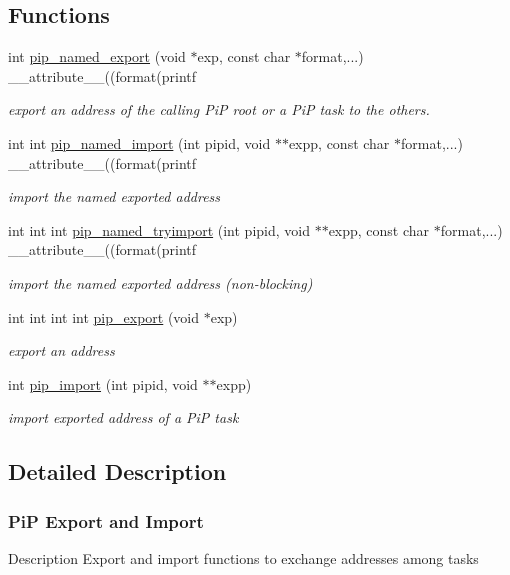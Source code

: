 \documentclass[twoside]{book}
\begin{document}
\subsection*{Functions}
\begin{DoxyCompactItemize}
\item 
int \hyperlink{group__pip-4-export_ga3613eaa34ad5a4985007ff9177eb6542}{pip\-\_\-named\-\_\-export} (void $\ast$exp, const char $\ast$format,...) \-\_\-\-\_\-attribute\-\_\-\-\_\-((format(printf
\begin{DoxyCompactList}\small\item\em export an address of the calling Pi\-P root or a Pi\-P task to the others. \end{DoxyCompactList}\item 
int int \hyperlink{group__pip-4-export_ga68bcfa436ddc6acaf25f67fc30430fc1}{pip\-\_\-named\-\_\-import} (int pipid, void $\ast$$\ast$expp, const char $\ast$format,...) \-\_\-\-\_\-attribute\-\_\-\-\_\-((format(printf
\begin{DoxyCompactList}\small\item\em import the named exported address \end{DoxyCompactList}\item 
int int int \hyperlink{group__pip-4-export_ga205d73fdb294d3cbfe095c14d5e63637}{pip\-\_\-named\-\_\-tryimport} (int pipid, void $\ast$$\ast$expp, const char $\ast$format,...) \-\_\-\-\_\-attribute\-\_\-\-\_\-((format(printf
\begin{DoxyCompactList}\small\item\em import the named exported address (non-\/blocking) \end{DoxyCompactList}\item 
int int int int \hyperlink{group__pip-4-export_ga92d98dc8bafe8c73d4332d40d77be6cb}{pip\-\_\-export} (void $\ast$exp)
\begin{DoxyCompactList}\small\item\em export an address \end{DoxyCompactList}\item 
int \hyperlink{group__pip-4-export_ga6d7ac596a9da824e40d7c06528f42e5f}{pip\-\_\-import} (int pipid, void $\ast$$\ast$expp)
\begin{DoxyCompactList}\small\item\em import exported address of a Pi\-P task \end{DoxyCompactList}\end{DoxyCompactItemize}


\subsection{Detailed Description}
\hypertarget{pip-export}{}\subsubsection{Pi\-P Export and Import}\label{pip-export}
\begin{DoxyParagraph}{Description}
Export and import functions to exchange addresses among tasks 
\end{DoxyParagraph}
\end{document}
